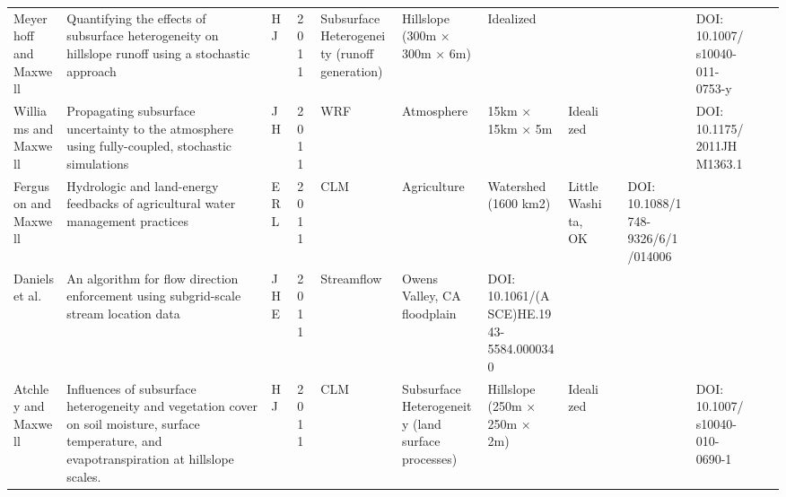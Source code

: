 {\begin{tabular}{ p{1cm} p{2cm} p{0.75cm} p{0.5cm} p{1cm} p{1.5cm} p{1cm} p{1cm} p{0.25cm} p{0.25cm} p{0.25cm} p{0.25cm} p{1cm} }
Meyerhoff and Maxwell & Quantifying the effects of subsurface heterogeneity on hillslope runoff using a stochastic approach & HJ & 2011 & Subsurface Heterogeneity (runoff generation) & Hillslope (300m × 300m × 6m) & Idealized &  &  &  & DOI: 10.1007/s10040-011-0753-y  \\
Williams and Maxwell & Propagating subsurface uncertainty to the atmosphere using fully-coupled, stochastic simulations & JH & 2011 & WRF & Atmosphere & 15km × 15km × 5m & Idealized &  &  & DOI: 10.1175/2011JHM1363.1 \\
Ferguson and Maxwell & Hydrologic and land-energy feedbacks of agricultural water management practices & ERL & 2011 & CLM & Agriculture & Watershed (1600 km2) & Little Washita, OK &  & DOI: 10.1088/1748-9326/6/1/014006 \\
Daniels et al. & An algorithm for flow direction enforcement using subgrid-scale stream location data & JHE & 2011 & Streamflow & Owens Valley, CA floodplain & DOI: 10.1061/(ASCE)HE.1943-5584.0000340 \\
Atchley and Maxwell & Influences of subsurface heterogeneity and vegetation cover on soil moisture, surface temperature, and evapotranspiration at hillslope scales. & HJ & 2011 & CLM & Subsurface Heterogeneity (land surface processes) & Hillslope (250m × 250m × 2m) & Idealized &  &  & DOI: 10.1007/s10040-010-0690-1  \\
\end{tabular}

}
